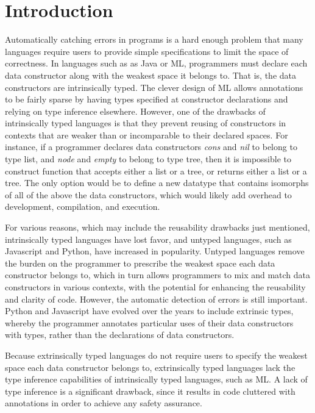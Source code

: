 \documentclass[acmsmall]{acmart}
\theoremstyle{definition}
\begin{document}
\section{Introduction}
\label{sec:introduction}

Automatically catching errors in programs is a hard enough problem
that many languages require users to provide simple specifications to limit the space of correctness.
In languages such as as Java or ML, programmers must declare each data constructor along with the weakest space it belongs to. 
That is, the data constructors are intrinsically typed.
The clever design of ML allows annotations to be fairly sparse by 
having types specified at constructor declarations and relying on type inference elsewhere.
However, one of the drawbacks of intrinsically typed languages is that they prevent reusing of
constructors in contexts that are weaker than or incomparable to their declared spaces. 
For instance, if a programmer declares data constructors \emph{cons} and \emph{nil} to belong to type list,
and \emph{node} and \emph{empty} to belong to type tree, then it is impossible to construct function
that accepts either a list or a tree, or returns either a list or a tree. The only option would be to define
a new datatype that contains isomorphs of all of the above the data constructors, which would 
likely add overhead to development, compilation, and execution.


For various reasons, which may include the reusability drawbacks just mentioned, 
intrinsically typed languages have lost favor,
and untyped languages, 
such as Javascript and Python, have increased in popularity. 
Untyped languages remove the burden on the programmer to prescribe the weakest space each data constructor belongs to, 
which in turn allows programmers to mix and match data constructors in
various contexts, with the potential for enhancing the reusability and clarity of code.
However, the automatic detection of errors is still important. Python and Javascript have 
evolved over the years to include extrinsic types, whereby the programmer annotates particular uses of
their data constructors with types, rather than the declarations of data constructors.
 
Because extrinsically typed languages do not require users to specify the weakest space each data constructor belongs to,
extrinsically typed languages lack the type inference capabilities of intrinsically typed languages, such as ML. 
A lack of type inference is a significant drawback, since it results in code cluttered with annotations in order
to achieve any safety assurance.
\end{document}
